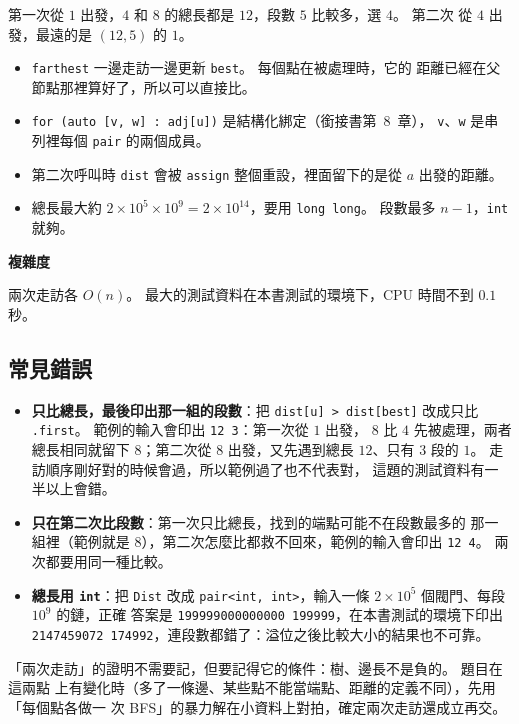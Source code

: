 第一次從 $1$ 出發，$4$ 和 $8$ 的總長都是 $12$，段數 $5$ 比較多，選 $4$。 第二次
從 $4$ 出發，最遠的是 $(12, 5)$ 的 $1$。

\begin{itemize}
\item \texttt{farthest} 一邊走訪一邊更新 \texttt{best}。 每個點在被處理時，它的
距離已經在父節點那裡算好了，所以可以直接比。
\item \texttt{for (auto [v, w] : adj[u])} 是結構化綁定（銜接書第~8~章），
\texttt{v}、\texttt{w} 是串列裡每個 \texttt{pair} 的兩個成員。
\item 第二次呼叫時 \texttt{dist} 會被 \texttt{assign} 整個重設，裡面留下的是從
$a$ 出發的距離。
\item 總長最大約 $2 \times 10^5 \times 10^9 = 2 \times 10^{14}$，要用
\texttt{long long}。 段數最多 $n - 1$，\texttt{int} 就夠。
\end{itemize}

\textbf{複雜度}

兩次走訪各 $O(n)$。 最大的測試資料在本書測試的環境下，CPU 時間不到 $0.1$ 秒。

\subsection{常見錯誤}

\begin{itemize}
\item \textbf{只比總長，最後印出那一組的段數}：把 \texttt{dist[u] > dist[best]}
改成只比 \texttt{.first}。 範例的輸入會印出 \texttt{12 3}：第一次從 $1$ 出發，
$8$ 比 $4$ 先被處理，兩者總長相同就留下 $8$；第二次從 $8$ 出發，又先遇到總長
$12$、只有 $3$ 段的 $1$。 走訪順序剛好對的時候會過，所以範例過了也不代表對，
這題的測試資料有一半以上會錯。
\item \textbf{只在第二次比段數}：第一次只比總長，找到的端點可能不在段數最多的
那一組裡（範例就是 $8$），第二次怎麼比都救不回來，範例的輸入會印出
\texttt{12 4}。 兩次都要用同一種比較。
\item \textbf{總長用 \texttt{int}}：把 \texttt{Dist} 改成
\texttt{pair<int, int>}，輸入一條 $2 \times 10^5$ 個閥門、每段 $10^9$ 的鏈，正確
答案是 \texttt{199999000000000 199999}，在本書測試的環境下印出
\texttt{2147459072 174992}，連段數都錯了：溢位之後比較大小的結果也不可靠。
\end{itemize}

\begin{apcsnote}
「兩次走訪」的證明不需要記，但要記得它的條件：樹、邊長不是負的。 題目在這兩點
上有變化時（多了一條邊、某些點不能當端點、距離的定義不同），先用「每個點各做一
次 BFS」的暴力解在小資料上對拍，確定兩次走訪還成立再交。
\end{apcsnote}

